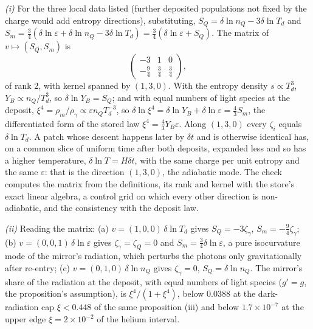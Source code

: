 \emph{(i)} For the three local data listed (further deposited populations not fixed by the charge would add entropy directions), substituting, $S_{Q} = \delta\ln n_{Q} - 3\delta\ln T_{d}$ and $S_{m} = \tfrac34(\delta\ln\varepsilon + \delta\ln n_{Q} - 3\delta\ln T_{d}) = \tfrac34(\delta\ln\varepsilon + S_{Q})$. The matrix of $v \mapsto (S_{Q}, S_{m})$ is
\[
\begin{pmatrix} -3 & 1 & 0 \\ -\tfrac94 & \tfrac34 & \tfrac34 \end{pmatrix},
\]
of rank $2$, with kernel spanned by $(1, 3, 0)$. With the entropy density $s \propto T_{d}^{3}$, $Y_{B} \propto n_{Q}/T_{d}^{3}$, so $\delta\ln Y_{B} = S_{Q}$; and with equal numbers of light species at the deposit, $\xi^{4} = \rho_{m}/\rho_{\gamma} \propto \varepsilon n_{Q}T_{d}^{-3}$, so $\delta\ln\xi^{4} = \delta\ln Y_{B} + \delta\ln\varepsilon = \tfrac43 S_{m}$, the differentiated form of the stored law $\xi^{4} = \tfrac43 Y_{B}\varepsilon$. Along $(1, 3, 0)$ every $\zeta_{i}$ equals $\delta\ln T_{d}$. A patch whose descent happens later by $\delta t$ and is otherwise identical has, on a common slice of uniform time after both deposits, expanded less and so has a higher temperature, $\delta\ln T = H\delta t$, with the same charge per unit entropy and the same $\varepsilon$: that is the direction $(1, 3, 0)$, the adiabatic mode. The check computes the matrix from the definitions, its rank and kernel with the store's exact linear algebra, a control grid on which every other direction is non-adiabatic, and the consistency with the deposit law.

\emph{(ii)} Reading the matrix: (a) $v = (1, 0, 0)\,\delta\ln T_{d}$ gives $S_{Q} = -3\zeta_{\gamma}$, $S_{m} = -\tfrac94\zeta_{\gamma}$; (b) $v = (0, 0, 1)\,\delta\ln\varepsilon$ gives $\zeta_{\gamma} = \zeta_{Q} = 0$ and $S_{m} = \tfrac34\delta\ln\varepsilon$, a pure isocurvature mode of the mirror's radiation, which perturbs the photons only gravitationally after re-entry; (c) $v = (0, 1, 0)\,\delta\ln n_{Q}$ gives $\zeta_{\gamma} = 0$, $S_{Q} = \delta\ln n_{Q}$. The mirror's share of the radiation at the deposit, with equal numbers of light species ($g' = g$, the proposition's assumption), is $\xi^{4}/(1 + \xi^{4})$, below $0.0388$ at the dark-radiation cap $\xi < 0.448$ of the same proposition (iii) and below $1.7 \times 10^{-7}$ at the upper edge $\xi = 2 \times 10^{-2}$ of the helium interval.

